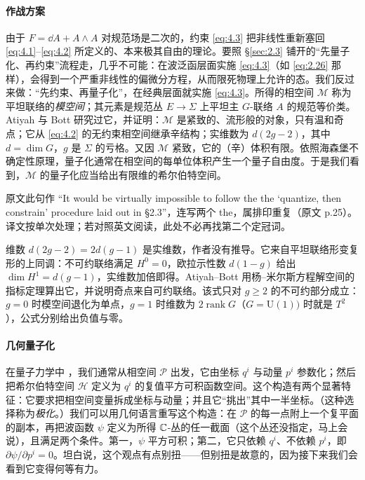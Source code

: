 \paragraph{作战方案}
由于 $F=\dd A+A\wedge A$ 对规范场是二次的，约束 \eqref{eq:4.3} 把非线性重新塞回 \eqref{eq:4.1}--\eqref{eq:4.2} 所定义的、本来极其自由的理论。要照 \S\ref{sec:2.3} 铺开的“先量子化、再约束”流程走，几乎不可能：在波泛函层面实施 \eqref{eq:4.3}（如 \eqref{eq:2.26} 那样），会得到一个严重非线性的偏微分方程，从而限死物理上允许的态。我们反过来做：“先约束、再量子化”，在经典层面就实施 \eqref{eq:4.3}。所得的相空间 $\mathcal{M}$ 称为平坦联络的\textit{模空间}；其元素是规范丛 $E\to\Sigma$ 上平坦主 $G$-联络 $A$ 的规范等价类。Atiyah 与 Bott \cite{atiyahbott1982} 研究过它，并证明：$\mathcal{M}$ 是紧致的、流形般的对象，只有温和奇点；它从 \eqref{eq:4.2} 的无约束相空间继承辛结构；实维数为 $d(2g-2)$，其中 $d=\dim G$，$g$ 是 $\Sigma$ 的亏格。又因 $\mathcal{M}$ 紧致，它的（辛）体积有限。依照海森堡不确定性原理，量子化通常在相空间的每单位体积产生一个量子自由度。于是我们看到，$\mathcal{M}$ 的量子化应当给出有限维的希尔伯特空间。

\begin{yizhu}[原文疑误]
原文此句作 “It would be virtually impossible to follow the the ‘quantize, then constrain’ procedure laid out in §2.3”，连写两个 the，属排印重复（原文 p.25）。译文按单次处理；若对照英文阅读，此处不必再找第二个定冠词。
\end{yizhu}

\begin{yizhu}[含糊点]
维数 $d(2g-2)=2d(g-1)$ 是实维数，作者没有推导。它来自平坦联络形变复形的上同调：不可约联络满足 $H^0=0$，欧拉示性数 $d(1-g)$ 给出 $\dim H^1=d(g-1)$，实维数加倍即得。Atiyah--Bott \cite{atiyahbott1982} 用杨--米尔斯方程解空间的指标定理算出它，并说明奇点来自可约联络。该式只对 $g\ge2$ 的不可约部分成立：$g=0$ 时模空间退化为单点，$g=1$ 时维数为 $2\operatorname{rank}G$（$G=\mathrm{U}(1))$ 时就是 $T^2$），公式分别给出负值与零。
\end{yizhu}

\paragraph{几何量子化}
在量子力学中 \cite{woodhouse}，我们通常从相空间 $\mathcal{P}$ 出发，它由坐标 $q^i$ 与动量 $p^i$ 参数化；然后把希尔伯特空间 $\mathcal{H}$ 定义为 $q^i$ 的复值平方可积函数空间。这个构造有两个显著特征：它要求把相空间变量拆成坐标与动量；并且它“挑出”其中一半坐标。（这种选择称为\textit{极化}。）我们可以用几何语言重写这个构造：在 $\mathcal{P}$ 的每一点附上一个复平面的副本，再把波函数 $\psi$ 定义为所得 $\mathbb{C}$-丛的任一截面（这个丛还没指定，马上会说），且满足两个条件。第一，$\psi$ 平方可积；第二，它只依赖 $q^i$、不依赖 $p^i$，即 $\partial\psi/\partial p^i=0$。坦白说，这个观点有点别扭——但别扭是故意的，因为接下来我们会看到它变得何等有力。

